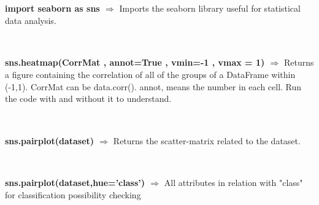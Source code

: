 \documentclass[a4paper,18pt]{article}
\begin{document}
\section{\colorbox {Abi}{}}
\subsection{\colorbox {matgreen}{\color{white}{\large import seaborn as sns}}}
\textbf{import seaborn as sns $\Rightarrow$} Imports the seaborn library useful for statistical data analysis.\\\\


\subsection{\colorbox {matgreen}{\color{white}{\large Correlation Matrix}}}
\textbf{sns.heatmap(CorrMat , annot=True , vmin=-1 , vmax = 1) $\Rightarrow$} Returns a figure containing the correlation of all of the groups of a DataFrame within (-1,1). CorrMat can be data.corr(). annot, means the number in each cell. Run the code with and without it to understand.\\\\


\subsection{\colorbox {matgreen}{\color{white}{\large Scatter Matrix}}}
\textbf{sns.pairplot(dataset) $\Rightarrow$} Returns the scatter-matrix related to the dataset.\\\\


\subsection{\colorbox {matgreen}{\color{white}{\large Scatter Matrix II}}}
\textbf{sns.pairplot(dataset,hue='class') $\Rightarrow$} All attributes in relation with "class" for classification possibility checking\\\\
\end{document}
